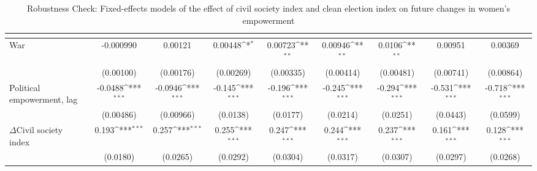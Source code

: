 \begin{table}[htbp]\centering
\def\sym#1{\ifmmode^{#1}\else\(^{#1}\)\fi}
\caption{Robustness Check: Fixed-effects models of the effect of civil society index and clean election index on future changes in women's empowerment \label{fepolempvdem}}
\begin{tabular}{l*{8}{c}}
\hline\hline
                    &&&&&&&&\\
\hline
War            &   -0.000990         &     0.00121         &     0.00448\sym{*}  &     0.00723\sym{**} &     0.00946\sym{**} &      0.0106\sym{**} &     0.00951         &     0.00369         \\
                    &   (0.00100)         &   (0.00176)         &   (0.00269)         &   (0.00335)         &   (0.00414)         &   (0.00481)         &   (0.00741)         &   (0.00864)         \\
[1em]
Political empowerment, lag &     -0.0488\sym{***}&     -0.0946\sym{***}&      -0.145\sym{***}&      -0.196\sym{***}&      -0.245\sym{***}&      -0.294\sym{***}&      -0.531\sym{***}&      -0.718\sym{***}\\
                    &   (0.00486)         &   (0.00966)         &    (0.0138)         &    (0.0177)         &    (0.0214)         &    (0.0251)         &    (0.0443)         &    (0.0599)         \\
[1em]
$\Delta$Civil society index        &       0.193\sym{***}&       0.257\sym{***}&       0.255\sym{***}&       0.247\sym{***}&       0.244\sym{***}&       0.237\sym{***}&       0.161\sym{***}&       0.128\sym{***}\\
                    &    (0.0180)         &    (0.0265)         &    (0.0292)         &    (0.0304)         &    (0.0317)         &    (0.0307)         &    (0.0297)         &    (0.0268)         \\

\end{tabular}
\end{table}
